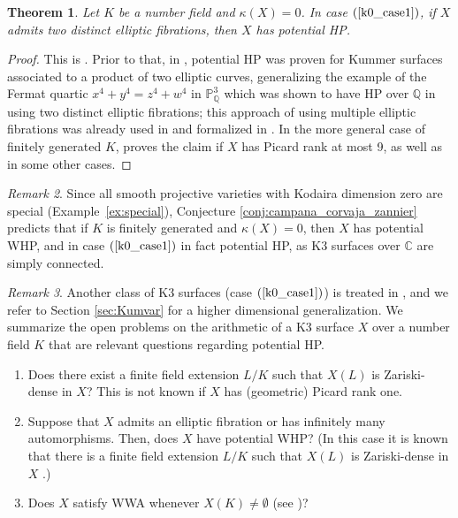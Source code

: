 \documentclass[10pt,a4paper]{amsart}
\theoremstyle{plain}
\newtheorem{theorem}{Theorem}
\theoremstyle{remark}
\newtheorem{remark}[theorem]{Remark}
\numberwithin{theorem}{section}
\begin{document}
\begin{theorem}
Let $K$ be a number field and $\kappa(X)=0$. 
In case $(\ref{k0_case1})$,
if $X$ admits two distinct elliptic fibrations, then $X$ has potential HP.
\end{theorem}

\begin{proof}
This is  \cite[Theorem 1.1]{GCM2}. 
Prior to that, in  \cite[Prop.~4.4]{Demeio2}, potential HP  was proven for  Kummer  surfaces associated to a product of two elliptic curves, generalizing the example of the Fermat quartic $x^4+y^4 = z^4+ w^4$ in $\mathbb{P}^3_{\mathbb{Q}}$ 
which was shown to have HP over $\mathbb{Q}$ in \cite[Theorem~1.6]{CZ} using two distinct elliptic fibrations; 
this approach of using multiple elliptic fibrations  was 
already used in \cite[Theorem 46.1]{Manin} and 
formalized  
in \cite[Theorem~1.1]{Demeio2}.  In the more general case of finitely generated $K$,
\cite[Theorem B]{GCM} proves the claim if $X$ has Picard rank at most 9, as well as in some other cases.
\end{proof}
 
\begin{remark}
Since all smooth projective varieties with Kodaira dimension zero are special 
(Example~\ref{ex:special}),
Conjecture \ref{conj:campana_corvaja_zannier} predicts that
if $K$ is finitely generated and $\kappa(X)=0$, then $X$ has potential WHP,
and in case $(\ref{k0_case1})$ in fact potential HP,
as K3 surfaces over $\mathbb{C}$ are simply connected.
\end{remark}

\begin{remark}
Another class of K3 surfaces (case $(\ref{k0_case1})$)
is treated in \cite[Theorem~1.3]{GCH},
and we refer to Section \ref{sec:Kumvar} for a higher dimensional generalization.
We summarize the open problems on the arithmetic of a K3 surface $X$ over a number field $K$
that are relevant questions regarding potential HP. 
\begin{enumerate}
 \item Does there exist a finite field extension $L/K$ such that $X(L)$ is Zariski-dense in $X$?  This is not known if $X$ has (geometric)  Picard rank one. 
    \item Suppose that $X$ admits an elliptic fibration or has infinitely many automorphisms. Then, does $X$ have potential WHP? (In this case it is known that there is a finite field extension $L/K$ such that $X(L)$ is Zariski-dense in $X$ \cite{BT, HT00}.)
   \item     Does $X$ satisfy WWA whenever $X(K)\neq\emptyset$ (see \cite[p.~484]{SkoZar})? 
\end{enumerate}
\end{remark} 
\end{document}

